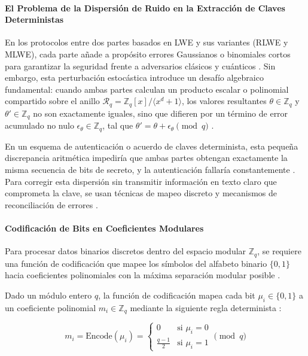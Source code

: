 \paragraph{El Problema de la Dispersión de Ruido en la Extracción de Claves Deterministas}

En los protocolos entre dos partes basados en LWE y sus variantes (RLWE y MLWE), cada parte añade a propósito errores Gaussianos o binomiales cortos para garantizar la seguridad frente a adversarios clásicos y cuánticos \cite{regev2009lwe, yang2025multiserver}. Sin embargo, esta perturbación estocástica introduce un desafío algebraico fundamental: cuando ambas partes calculan un producto escalar o polinomial compartido sobre el anillo $\mathcal{R}_q = \mathbb{Z}_q[x]/\langle x^d + 1 \rangle$, los valores resultantes $\theta \in \mathbb{Z}_q$ y $\theta' \in \mathbb{Z}_q$ no son exactamente iguales, sino que difieren por un término de error acumulado no nulo $\epsilon_\theta \in \mathbb{Z}_q$, tal que $\theta' = \theta + \epsilon_\theta \pmod q$ \cite{yang2025multiserver, rewal2023quantumsafe}.

En un esquema de autenticación o acuerdo de claves determinista, esta pequeña discrepancia aritmética impediría que ambas partes obtengan exactamente la misma secuencia de bits de secreto, y la autenticación fallaría constantemente \cite{yang2025multiserver, mukil2026implementing}. Para corregir esta dispersión sin transmitir información en texto claro que comprometa la clave, se usan técnicas de mapeo discreto y mecanismos de reconciliación de errores \cite{yang2025multiserver, rewal2023quantumsafe}.

\paragraph{Codificación de Bits en Coeficientes Modulares}

Para procesar datos binarios discretos dentro del espacio modular $\mathbb{Z}_q$, se requiere una función de codificación que mapee los símbolos del alfabeto binario $\{0, 1\}$ hacia coeficientes polinomiales con la máxima separación modular posible \cite{nguyen2019high, mukil2026implementing}.

Dado un módulo entero $q$, la función de codificación mapea cada bit $\mu_i \in \{0, 1\}$ a un coeficiente polinomial $m_i \in \mathbb{Z}_q$ mediante la siguiente regla determinista \cite{nguyen2019high}:

\begin{equation}
m_i = \text{Encode}(\mu_i) = \begin{cases} 0 & \text{si } \mu_i = 0 \\ \frac{q-1}{2} & \text{si } \mu_i = 1 \end{cases} \pmod q
\end{equation}

